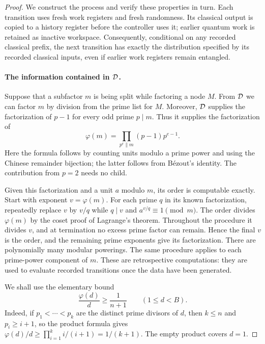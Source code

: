\begin{proof}
We construct the process and verify these properties in turn.
Each transition uses fresh work registers and fresh randomness.  Its
classical output is copied to a history register before the controller
uses it; earlier quantum work is retained as inactive workspace.
Consequently, conditional on any recorded classical prefix, the next
transition has exactly the distribution specified by its recorded
classical inputs, even if earlier work registers remain entangled.

\paragraph{The information contained in $\mathcal D$.}
Suppose that a subfactor $m$ is being split while factoring a node $M$.
From $\mathcal D$ we can factor $m$ by division from the prime list for $M$.
Moreover, $\mathcal D$ supplies the factorization of $p-1$ for every odd prime
$p\mid m$.  Thus it supplies the factorization of
\begin{equation}\label{eq:totient-from-data}
 \varphi(m)=\prod_{p^e\parallel m}(p-1)p^{e-1}.
\end{equation}
Here the formula follows by counting units modulo a prime power and using
the Chinese remainder bijection; the latter follows from B\'ezout's
identity.  The contribution from $p=2$ needs no child.

Given this factorization and a unit $a$ modulo $m$, its order is computable
exactly.  Start with exponent $v=\varphi(m)$.  For each prime $q$ in its known
factorization, repeatedly replace $v$ by $v/q$ while $q\mid v$ and
$a^{v/q}\equiv1\pmod m$.  The order divides
$\varphi(m)$ by the coset proof of Lagrange's theorem.  Throughout the
procedure it divides $v$, and at termination no excess prime factor can
remain.  Hence the final $v$ is the order, and the remaining prime
exponents give its factorization.  There are polynomially many modular
powerings.  The same procedure applies to each prime-power component of
$m$.  These are retrospective computations: they are used to evaluate
recorded transitions once the data have been generated.

We shall use the elementary bound
\begin{equation}\label{eq:totient-lower-bound}
 \frac{\varphi(d)}d\ge\frac1{n+1}\qquad(1\le d<B).
\end{equation}
Indeed, if $p_1<\cdots<p_k$ are the distinct prime divisors of $d$, then
$k\le n$ and $p_i\ge i+1$, so the product formula gives
$\varphi(d)/d\ge\prod_{i=1}^k i/(i+1)=1/(k+1)$.
The empty product covers $d=1$.


\end{proof}
